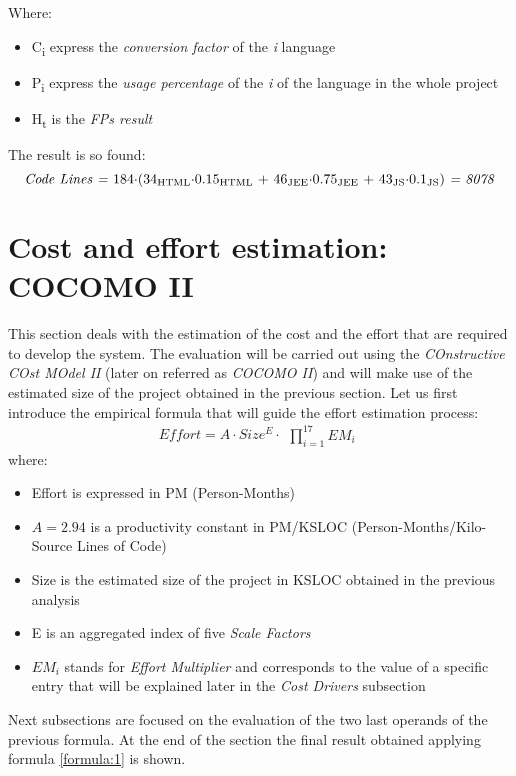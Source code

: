 \documentclass[11pt,a4paper]{report}
\begin{document}
Where:
\begin{itemize}
	\item C\textsubscript{i} express the \textit{conversion factor} of the \textit{i} language
	\item P\textsubscript{i}
	express the \textit{usage percentage} of the \textit{i} of the language in the whole project
	\item H\textsubscript{t} is the \textit{FPs result}
\end{itemize}
The result is so found:
\begin{equation}
\centerline{\textit{Code Lines =} $184\cdot$($34\textsubscript{HTML}\cdot$0.15\textsubscript{HTML} + $46\textsubscript{JEE}\cdot$0.75\textsubscript{JEE} + $43\textsubscript{JS}\cdot$0.1\textsubscript{JS}) \textit{= 8078}}
\end{equation}
\newpage
\section{Cost and effort estimation: COCOMO II}
This section deals with the estimation of the cost and the effort that are required to develop the system. The evaluation will be carried out using the \textit{COnstructive COst MOdel II} (later on referred as \textit{COCOMO II}) and will make use of the estimated size of the project obtained in the previous section. Let us first introduce the empirical formula that will guide the effort estimation process:
\begin{equation} \label{formula:1}
Effort = A \cdot Size^E \cdot \begin{matrix} \prod_{i=1}^{17} EM_i \end{matrix}
\end{equation}
\noindent where:
\begin{itemize}
	\item Effort is expressed in PM (Person-Months)
	\item $A = 2.94$ is a productivity constant in PM/KSLOC (Person-Months/Kilo-Source Lines of Code)
	\item Size is the estimated size of the project in KSLOC obtained in the previous analysis
	\item E is an aggregated index of five \textit{Scale Factors}
	\item $EM_{i}$ stands for \textit{Effort Multiplier} and corresponds to the value of a specific entry that will be explained later in the \textit{Cost Drivers} subsection
\end{itemize}
Next subsections are focused on the evaluation of the two last operands of the previous formula. At the end of the section the final result obtained applying formula \ref{formula:1} is shown.
\end{document}
